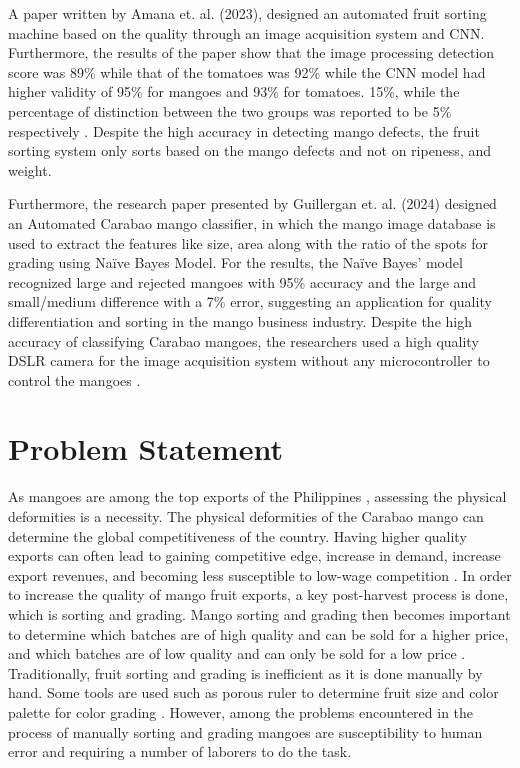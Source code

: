 A paper written by Amana et. al. (2023), designed an automated fruit sorting machine based on the quality through 
an image acquisition system and CNN. Furthermore, the results of the paper show that the image processing detection 
score was 89\% while that of the tomatoes was 92\% while the CNN model had higher validity of 95\% for mangoes and 93\% 
for tomatoes. 15\%, while the percentage of distinction between the two groups was reported to be 5\% respectively 
\cite{amna-et-al-machine-2023}. Despite the high accuracy in detecting mango defects, the fruit sorting system only sorts based 
on the mango defects and not on ripeness, and weight.

Furthermore, the research paper presented by Guillergan et. al. (2024) designed an Automated Carabao mango classifier, 
in which the mango image database is used to extract the features like size, area along with the ratio of the spots for 
grading using Naïve Bayes Model. For the results, the Naïve Bayes’ model recognized large and rejected mangoes with 95\%
 accuracy and the large and small/medium difference with a 7\% error, suggesting an application for quality differentiation 
 and sorting in the mango business industry. Despite the high accuracy of classifying Carabao mangoes, the researchers used a 
 high quality DSLR camera for the image acquisition system without any microcontroller to control the mangoes \cite{guillergan-naive-2024}. 


\section{Problem Statement}
As mangoes are among the top exports of the Philippines \cite{centino-current-nodate}, 
assessing the physical deformities is a necessity. The physical deformities of the 
Carabao mango can determine the global competitiveness of the country. Having higher quality
 exports can often lead to gaining competitive edge, increase in demand, increase export revenues,
  and becoming less susceptible to low-wage competition \cite{dadamo-determinants-2018}. In order to increase the 
  quality of mango fruit exports, a key post-harvest process is done, which is sorting and grading.
   Mango sorting and grading then becomes important to determine which batches are of high quality and
    can be sold for a higher price, and which batches are of low quality and can only be sold for a low price
	 \cite{zhengzhou-first-industry-co-ltd-what-nodate}. Traditionally, fruit sorting and grading is inefficient as it is
	  done manually by hand. Some tools are used such as porous ruler to determine fruit size and color palette 
	  for color grading \cite{zhengzhou-first-industry-co-ltd-what-nodate}. However, among the problems encountered in the 
	  process of manually sorting and grading mangoes are susceptibility to human error and requiring a number of 
	  laborers to do the task. 

